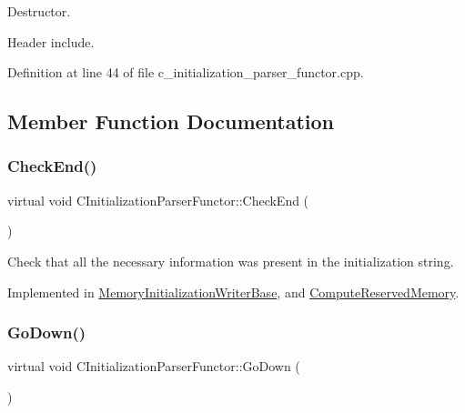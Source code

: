 Destructor. 

Header include. 

Definition at line 44 of file c\+\_\+initialization\+\_\+parser\+\_\+functor.\+cpp.



\subsection{Member Function Documentation}
\mbox{\label{classCInitializationParserFunctor_aa639277133d141fd3aeed2add158c920}} 
\subsubsection{\texorpdfstring{Check\+End()}{CheckEnd()}}
{\footnotesize\ttfamily virtual void C\+Initialization\+Parser\+Functor\+::\+Check\+End (\begin{DoxyParamCaption}{ }\end{DoxyParamCaption})\hspace{0.3cm}{\ttfamily [pure virtual]}}



Check that all the necessary information was present in the initialization string. 



Implemented in \hyperlink{classMemoryInitializationWriterBase_a33b7ee7cf9c476b02a3f6fb1e6e22a25}{Memory\+Initialization\+Writer\+Base}, and \hyperlink{classComputeReservedMemory_a5353a626c8ef1f507c379bec8f5fb36e}{Compute\+Reserved\+Memory}.

\mbox{\label{classCInitializationParserFunctor_acd23f951887db083c2c02d4e0865e260}} 
\subsubsection{\texorpdfstring{Go\+Down()}{GoDown()}}
{\footnotesize\ttfamily virtual void C\+Initialization\+Parser\+Functor\+::\+Go\+Down (\begin{DoxyParamCaption}{ }\end{DoxyParamCaption})\hspace{0.3cm}{\ttfamily [pure virtual]}}



